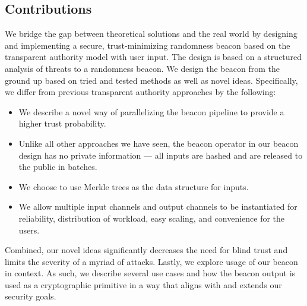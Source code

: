 \subsection{Contributions}
We bridge the gap  between theoretical solutions and the real world by designing and implementing a secure, trust-minimizing randomness beacon based on the transparent authority model with user input.
The design is based on a structured analysis of threats to a randomness beacon.
We design the beacon from the ground up based on tried and tested methods as well as novel ideas.
Specifically, we differ from previous transparent authority approaches by the following:
\begin{itemize}
    \item We describe a novel way of parallelizing the beacon pipeline to provide a higher trust probability.
    \item Unlike all other approaches we have seen, the beacon operator in our beacon design has no private information --- all inputs are hashed and are released to the public in batches.
    \item We choose to use Merkle trees as the data structure for inputs.
    \item We allow multiple input channels and output channels to be instantiated for reliability, distribution of workload, easy scaling, and convenience for the users.
\end{itemize}
Combined, our novel ideas significantly decreases the need for blind trust and limits the severity of a myriad of attacks.
Lastly, we explore usage of our beacon in context. As such, we describe several use cases and how the beacon output is used as a cryptographic primitive in a way that aligns with and extends our security goals.
